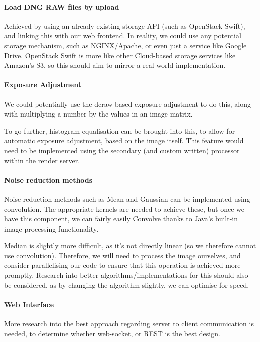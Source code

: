 \documentclass[14pt]{article}
\begin{document}
\paragraph{Load DNG RAW files by upload}
Achieved by using an already existing storage API (such as OpenStack Swift), and
linking this with our web frontend. In reality, we could use any potential storage
mechanism, such as NGINX/Apache, or even just a service like Google Drive. OpenStack
Swift is more like other Cloud-based storage services like Amazon's S3, so this should
aim to mirror a real-world implementation.

\paragraph{Exposure Adjustment}
We could potentially use the dcraw-based exposure adjustment to do this, along with
multiplying a number by the values in an image matrix.

To go further, histogram equalisation can be brought into this, to allow for automatic
exposure adjustment, based on the image itself. This feature would need to be implemented
using the secondary (and custom written) processor within the render server.

\paragraph{Noise reduction methods}
Noise reduction methods such as Mean and Gaussian can be implemented using convolution.
The appropriate kernels are needed to achieve these, but once we have this component, we can
fairly easily Convolve thanks to Java's built-in image processing functionality.

Median is slightly more difficult, as it's not directly linear (so we therefore cannot use convolution).
Therefore, we will need to process the image ourselves, and consider parallelising our code to ensure
that this operation is achieved more promptly. Research into better algorithms/implementations for this
should also be considered, as by changing the algorithm slightly, we can optimise for speed.

\paragraph{Web Interface}
More research into the best approach regarding server to client communication is needed, to determine
whether web-socket, or REST is the best design.
\end{document}
